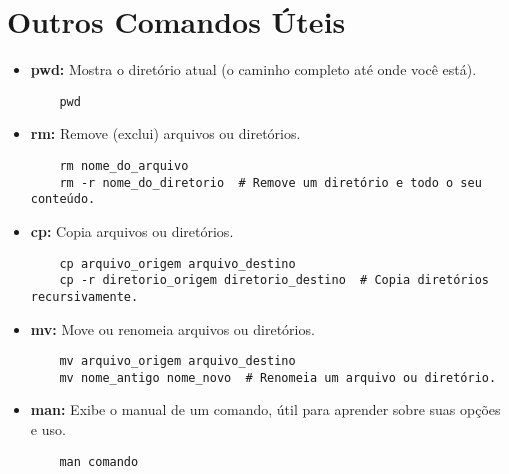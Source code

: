 \section{Outros Comandos Úteis}
\begin{itemize}
    \item \textbf{pwd:} Mostra o diretório atual (o caminho completo até onde você está).
    \begin{verbatim}
    pwd
    \end{verbatim}
    
    \item \textbf{rm:} Remove (exclui) arquivos ou diretórios.
    \begin{verbatim}
    rm nome_do_arquivo
    rm -r nome_do_diretorio  # Remove um diretório e todo o seu conteúdo.
    \end{verbatim}
    
    \item \textbf{cp:} Copia arquivos ou diretórios.
    \begin{verbatim}
    cp arquivo_origem arquivo_destino
    cp -r diretorio_origem diretorio_destino  # Copia diretórios recursivamente.
    \end{verbatim}
    
    \item \textbf{mv:} Move ou renomeia arquivos ou diretórios.
    \begin{verbatim}
    mv arquivo_origem arquivo_destino
    mv nome_antigo nome_novo  # Renomeia um arquivo ou diretório.
    \end{verbatim}
    
    \item \textbf{man:} Exibe o manual de um comando, útil para aprender sobre suas opções e uso.
    \begin{verbatim}
    man comando
    \end{verbatim}
\end{itemize}

